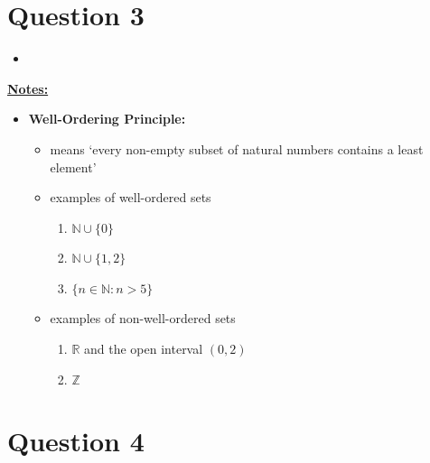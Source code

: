 \documentclass[12pt]{article}
\begin{document}
\begin{enumerate}[a.]




\end{enumerate}

\section*{Question 3}
\begin{itemize}
    \item

\end{itemize}

\bigskip

\underline{\textbf{Notes:}}

\begin{itemize}
    \item \textbf{Well-Ordering Principle:}

    \begin{itemize}
        \item means `every non-empty subset of natural numbers contains a least element'
        \item examples of well-ordered sets
        \begin{enumerate}[1.]
            \item $\mathbb{N} \cup \{0\}$
            \item $\mathbb{N} \cup \{1,2\}$
            \item $\{n \in \mathbb{N}: n > 5\}$
        \end{enumerate}
        \item examples of non-well-ordered sets
        \begin{enumerate}[1.]
            \item $\mathbb{R}$ and the open interval $(0,2)$
            \item $\mathbb{Z}$
        \end{enumerate}
    \end{itemize}
\end{itemize}

\section*{Question 4}
\end{document}
